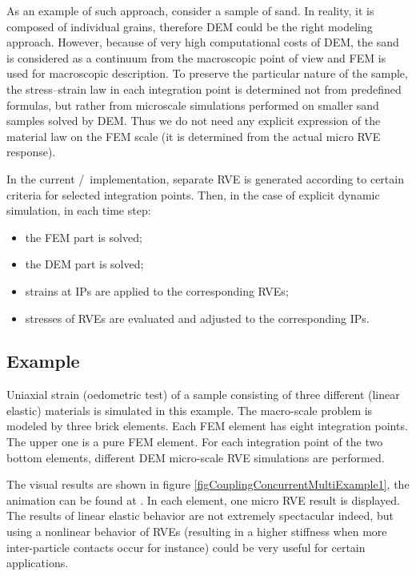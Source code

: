 As an example of such approach, consider a sample of sand.
In reality, it is composed of individual grains, therefore DEM could be the right modeling approach.
However, because of very high computational costs of DEM, the sand is considered as a continuum from the macroscopic point of view and FEM is used for macroscopic description.
To preserve the particular nature of the sample, the stress--strain law in each integration point is determined not from predefined formulas,
but rather from microscale simulations performed on smaller sand samples solved by DEM.
Thus we do not need any explicit expression of the material law on the FEM scale (it is determined from the actual micro RVE response).

In the current \OOFEM/\YADE\ implementation, separate RVE is generated according to certain criteria for selected integration points.
Then, in the case of explicit dynamic simulation, in each time step:
\begin{itemize}
	\item the FEM part is solved;
	\item the DEM part is solved;
	\item strains at IPs are applied to the corresponding RVEs;
	\item stresses of RVEs are evaluated and adjusted to the corresponding IPs.
\end{itemize}



\subsection{Example}
Uniaxial strain (oedometric test) of a sample consisting of three different (linear elastic) materials is simulated in this example.
The macro-scale problem is modeled by three brick elements.
Each FEM element has eight integration points.
The upper one is a pure FEM element.
For each integration point of the two bottom elements, different DEM micro-scale RVE simulations are performed.

The visual results are shown in figure \ref{figCouplingConcurrentMultiExample1}, the animation can be found at .
In each  element, one micro RVE result is displayed.
The results of linear elastic behavior are not extremely spectacular indeed, but using a nonlinear behavior of RVEs (resulting in a higher stiffness when more inter-particle contacts occur for instance) could be very useful for certain applications.







